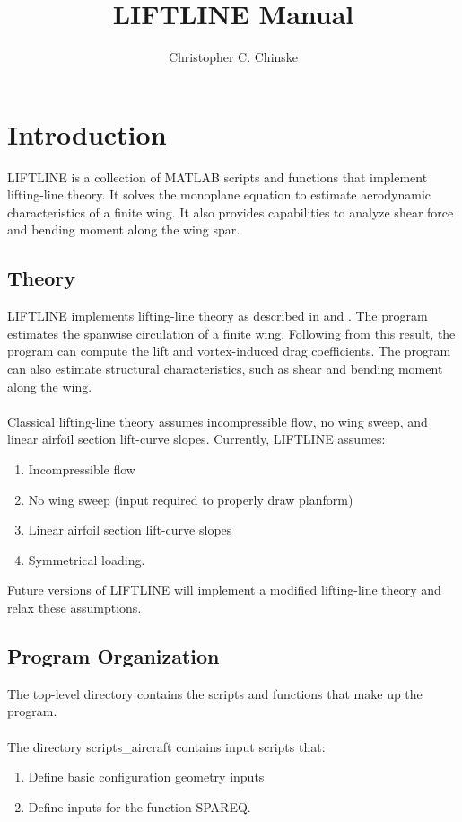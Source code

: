 \documentclass{article}
\title{LIFTLINE Manual}
\author{Christopher C. Chinske}
\begin{document}
\maketitle
\newpage
\tableofcontents
\newpage
\section{Introduction}
LIFTLINE is a collection of MATLAB scripts and functions that
implement lifting-line theory.  It solves the monoplane equation to
estimate aerodynamic characteristics of a finite wing.  It also
provides capabilities to analyze shear force and bending moment along
the wing spar.
\subsection{Theory}
LIFTLINE implements lifting-line theory as described in \cite{bertin}
and \cite{anderson}.  The program estimates the spanwise circulation
of a finite wing.  Following from this result, the program can compute
the lift and vortex-induced drag coefficients.  The program can also
estimate structural characteristics, such as shear and bending moment
along the wing.
\paragraph{}
Classical lifting-line theory assumes incompressible flow, no wing
sweep, and linear airfoil section lift-curve slopes.  Currently,
LIFTLINE assumes:
\begin{enumerate}
\item Incompressible flow
\item No wing sweep (input required to properly draw planform)
\item Linear airfoil section lift-curve slopes
\item Symmetrical loading.
\end{enumerate}
Future versions of LIFTLINE will implement a modified lifting-line
theory and relax these assumptions.
\subsection{Program Organization}
The top-level directory contains the scripts and functions that make
up the program.
\paragraph{}
The directory scripts\_aircraft contains input scripts that:
\begin{enumerate}
\item Define basic configuration geometry inputs
\item  Define inputs for the function SPAREQ.
\end{enumerate}
\end{document}
